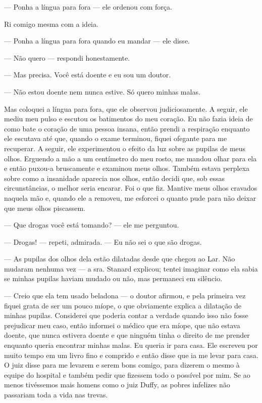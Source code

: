 --- Ponha a língua para fora --- ele ordenou com força.

Ri comigo mesma com a ideia.

--- Ponha a língua para fora quando eu mandar --- ele disse.

--- Não quero --- respondi honestamente.

--- Mas precisa. Você está doente e eu sou um doutor.

--- Não estou doente nem nunca estive. Só quero minhas malas.


Mas coloquei a língua para fora, que ele observou judiciosamente. A seguir,
ele mediu meu pulso e escutou os batimentos do meu coração. Eu não fazia
ideia de como bate o coração de uma pessoa insana, então prendi a
respiração enquanto ele escutava até que, quando o exame terminou,
fiquei ofegante para me recuperar. A seguir, ele experimentou o efeito
da luz sobre as pupilas de meus olhos. Erguendo a mão a um centímetro do
meu rosto, me mandou olhar para ela e então puxou-a bruscamente e
examinou meus olhos. Também estava perplexa sobre como a insanidade
aparecia nos olhos, então decidi que, sob essas circunstâncias, o melhor
seria encarar. Foi o que fiz. Mantive meus olhos cravados naquela mão e,
quando ele a removeu, me esforcei o quanto pude para não deixar que meus
olhos piscassem.

--- Que drogas você está tomando? --- ele me perguntou.

--- Drogas! --- repeti, admirada. --- Eu não sei o que são drogas.

--- As pupilas dos olhos dela estão dilatadas desde que chegou ao Lar.
Não mudaram nenhuma vez --- a sra. Stanard explicou; tentei imaginar
como ela sabia se minhas pupilas haviam mudado ou não, mas permaneci em
silêncio.

--- Creio que ela tem usado beladona --- o doutor afirmou, e pela
primeira vez fiquei grata de ser um pouco míope, o que obviamente
explica a dilatação de minhas pupilas. Considerei que poderia contar a
verdade quando isso não fosse prejudicar meu caso, então informei o
médico que era míope, que não estava doente, que nunca estivera doente e
que ninguém tinha o direito de me prender enquanto queria encontrar
minhas malas. Eu queria ir para casa. Ele escreveu por muito tempo em um
livro fino e comprido e então disse que ia me levar para casa. O juiz
disse para me levarem e serem bons comigo, para dizerem o mesmo à equipe
do hospital e também pedir que fizessem todo o possível por mim. Se ao
menos tivéssemos mais homens como o juiz Duffy, as pobres infelizes não
passariam toda a vida nas trevas.

